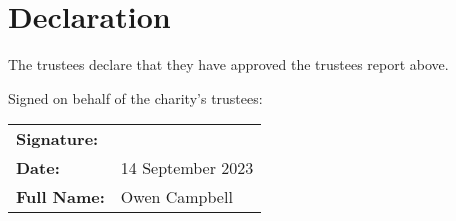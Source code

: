 \documentclass[11pt, final]{article}
\begin{document}
\section{Declaration}
The trustees declare that they have approved the trustees report above.


Signed on behalf of the charity's trustees:

\begin{tabular}{l l}
	\textbf{Signature:}\vspace{3cm}                       \\
	\textbf{Date:}      & 14 September 2023\vspace{1cm} \\
	\textbf{Full Name:} & Owen Campbell                   \\
\end{tabular}
\end{document}
